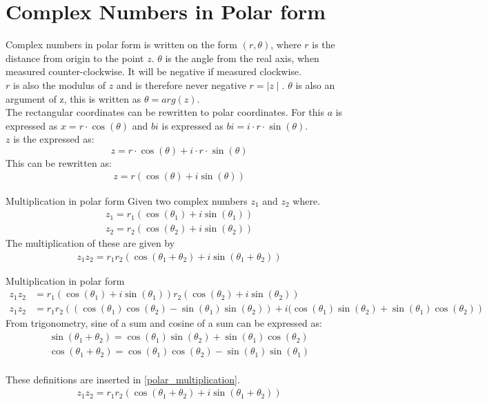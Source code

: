\section{Complex Numbers in Polar form}
Complex numbers in polar form is written on the form $(r,\theta)$, where $r$ is the distance from origin to the point $z$. $\theta$ is the angle from the real axis, when measured counter-clockwise. It will be negative if measured clockwise. \\
$r$ is also the modulus of $z$ and is therefore never negative $r=\mid z\mid$. $\theta$ is also an argument of z, this is written as $\theta=arg(z)$. %
\\ 
The rectangular coordinates can be rewritten to polar coordinates. For this $a$ is expressed as $x=r\cdot \cos(\theta)$ and $bi$ is expressed as $bi=i\cdot r\cdot \sin(\theta)$. \\
$z$ is the expressed as:
$$z=r\cdot \cos(\theta) + i\cdot r\cdot \sin(\theta)$$
This can be rewritten as:
\begin{align}
z=r(\cos(\theta)+i \sin(\theta))
\end{align}
\begin{theorem}{Multiplication in polar form}{}
Given two complex numbers $z_1$ and $z_2$ where.
\begin{align*}
z_1=r_1(\cos(\theta_1)+i\sin(\theta_1)) 
\\
z_2=r_2(\cos(\theta_2)+i\sin(\theta_2))
\end{align*}
The multiplication of these are given by
\begin{align}
z_1 z_2=r_1r_2\left( \cos(\theta_1+\theta_2)+ i \sin(\theta_1+\theta_2)\right)
\end{align}
\end{theorem}
\begin{prof}{Multiplication in polar form}{}
\begin{align}
z_1 z_2&=r_1( \cos(\theta_1)+ i \sin(\theta_1))r_2( \cos(\theta_2)+ i \sin(\theta_2)) \nonumber
\\
\label{polar_multiplication}
z_1z_2&=r_1r_2\left( (\cos(\theta_1)\cos(\theta_2)-\sin(\theta_1) \sin(\theta_2))+i(\cos(\theta_1)\sin(\theta_2)+\sin(\theta_1)\cos(\theta_2)\right)
\end{align}
From trigonometry, sine of a sum and cosine of a sum can be expressed as:
\\
\begin{align} \label{sum_cos_sin}
\sin(\theta_1+\theta_2)=\cos(\theta_1)\sin(\theta_2)+\sin(\theta_1)\cos(\theta_2)
\\
\cos(\theta_1+\theta_2)=\cos(\theta_1)\cos(\theta_2)-\sin(\theta_1)\sin(\theta_1)
\end{align}
\\
These definitions are inserted in \eqref{polar_multiplication}.
\\
\begin{align}
z_1 z_2=r_1r_2\left( \cos(\theta_1+\theta_2)+ i \sin(\theta_1+\theta_2)\right)
\end{align}
\end{prof}
